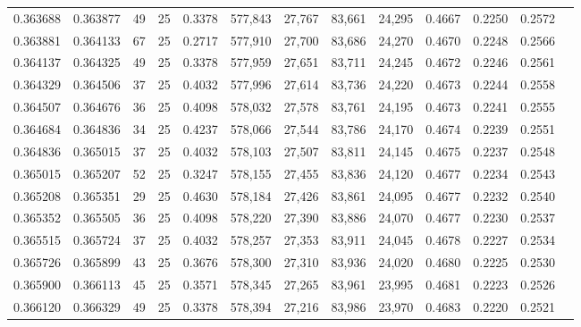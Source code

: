 \begin{tabular}{rrrrrrrrrrrrr}
0.363688 & 0.363877 &    49 &  25 &                                     0.3378 & 577,843 &  27,767 &  83,661 &  24,295 & 0.4667 & 0.2250 & 0.2572 \\
0.363881 & 0.364133 &    67 &  25 &                                     0.2717 & 577,910 &  27,700 &  83,686 &  24,270 & 0.4670 & 0.2248 & 0.2566 \\
0.364137 & 0.364325 &    49 &  25 &                                     0.3378 & 577,959 &  27,651 &  83,711 &  24,245 & 0.4672 & 0.2246 & 0.2561 \\
0.364329 & 0.364506 &    37 &  25 &                                     0.4032 & 577,996 &  27,614 &  83,736 &  24,220 & 0.4673 & 0.2244 & 0.2558 \\
0.364507 & 0.364676 &    36 &  25 &                                     0.4098 & 578,032 &  27,578 &  83,761 &  24,195 & 0.4673 & 0.2241 & 0.2555 \\
0.364684 & 0.364836 &    34 &  25 &                                     0.4237 & 578,066 &  27,544 &  83,786 &  24,170 & 0.4674 & 0.2239 & 0.2551 \\
0.364836 & 0.365015 &    37 &  25 &                                     0.4032 & 578,103 &  27,507 &  83,811 &  24,145 & 0.4675 & 0.2237 & 0.2548 \\
0.365015 & 0.365207 &    52 &  25 &                                     0.3247 & 578,155 &  27,455 &  83,836 &  24,120 & 0.4677 & 0.2234 & 0.2543 \\
0.365208 & 0.365351 &    29 &  25 &                                     0.4630 & 578,184 &  27,426 &  83,861 &  24,095 & 0.4677 & 0.2232 & 0.2540 \\
0.365352 & 0.365505 &    36 &  25 &                                     0.4098 & 578,220 &  27,390 &  83,886 &  24,070 & 0.4677 & 0.2230 & 0.2537 \\
0.365515 & 0.365724 &    37 &  25 &                                     0.4032 & 578,257 &  27,353 &  83,911 &  24,045 & 0.4678 & 0.2227 & 0.2534 \\
0.365726 & 0.365899 &    43 &  25 &                                     0.3676 & 578,300 &  27,310 &  83,936 &  24,020 & 0.4680 & 0.2225 & 0.2530 \\
0.365900 & 0.366113 &    45 &  25 &                                     0.3571 & 578,345 &  27,265 &  83,961 &  23,995 & 0.4681 & 0.2223 & 0.2526 \\
0.366120 & 0.366329 &    49 &  25 &                                     0.3378 & 578,394 &  27,216 &  83,986 &  23,970 & 0.4683 & 0.2220 & 0.2521 \\

\end{tabular}
